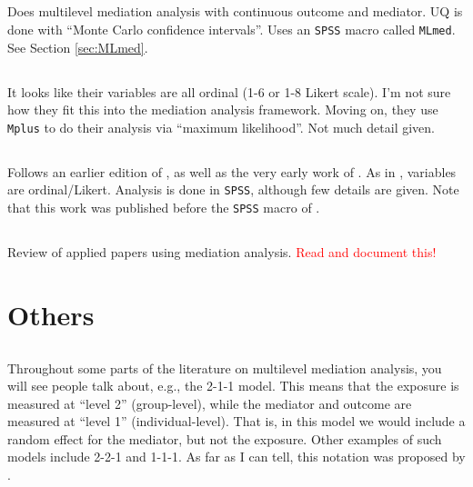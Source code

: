\documentclass{report}
\begin{document}
\subsection{\citet{Vea19}}

Does multilevel mediation analysis with continuous outcome and mediator. UQ is done with ``Monte Carlo confidence intervals''. Uses an \texttt{SPSS} macro called \texttt{MLmed}. See Section \ref{sec:MLmed}.

\subsection{\citet{Ara21}}

It looks like their variables are all ordinal (1-6 or 1-8 Likert scale). I'm not sure how they fit this into the mediation analysis framework. Moving on, they use \texttt{Mplus} to do their analysis via ``maximum likelihood''. Not much detail given.

\subsection{\citet{Hwa12}}

Follows an earlier edition of \citet{Mac17}, as well as the very early work of \citet{Bar86}. As in \citet{Ara21}, variables are ordinal/Likert. Analysis is done in \texttt{SPSS}, although few details are given. Note that this work was published before the \texttt{SPSS} macro of \citet{Roc19}.

\subsection{\citet{Rij21}}

Review of applied papers using mediation analysis. \textcolor{red}{Read and document this!}


\section{Others}
\label{sec:other}

\subsection{\citet{Kru01}}

Throughout some parts of the literature on multilevel mediation analysis, you will see people talk about, e.g., the 2-1-1 model. This means that the exposure is measured at ``level 2'' (group-level), while the mediator and outcome are measured at ``level 1'' (individual-level). That is, in this model we would include a random effect for the mediator, but not the exposure. Other examples of such models include 2-2-1 and 1-1-1. As far as I can tell, this notation was proposed by \citet{Kru01}.
\end{document}
